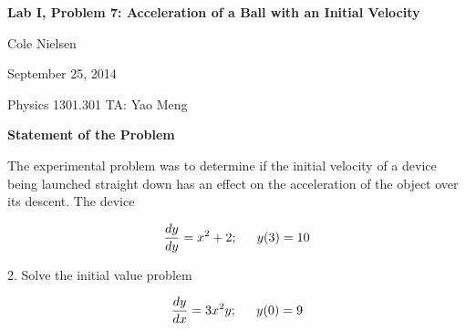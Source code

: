 \documentclass[12pt]{article}
\date{}
\begin{document}
	\begin{center}
		\textbf{\normalsize{Lab I, Problem 7: Acceleration of a Ball with an Initial Velocity}}
		
		Cole Nielsen
		
		September 25, 2014	
		
		Physics 1301.301 TA: Yao Meng
	\end{center}
	\textbf{Statement of the Problem}
	\newline      
	
	The experimental problem was to determine if the initial velocity of a device being launched straight down has an effect on the acceleration of the object over its descent. The device 
	
	\begin{equation}
		\frac{dy}{dy} = x^2	+2; \indent{y(3) = 10}\nonumber
	\end{equation}
	\vspace{3in}
	
	2. Solve the initial value problem
	
	\begin{equation}
		\frac{dy}{dx} = 3x^2y; \indent{y(0) = 9}\nonumber
	\end{equation}
\end{document}
